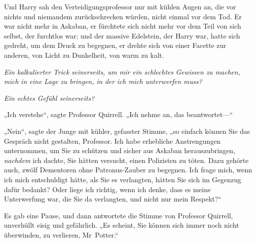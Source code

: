 Und Harry sah den Verteidigungsprofessor nur mit kühlen Augen an, die vor nichts und niemandem zurückschrecken würden, nicht einmal vor dem Tod. Er war nicht mehr in Askaban, er fürchtete sich nicht mehr vor dem Teil von sich selbst, der furchtlos war; und der massive Edelstein, der Harry war, hatte sich gedreht, um dem Druck zu begegnen, er drehte sich von einer Facette zur anderen, von Licht zu Dunkelheit, von warm zu kalt.

\emph{Ein kalkulierter Trick seinerseits, um mir ein schlechtes Gewissen zu machen, mich in eine Lage zu bringen, in der ich mich unterwerfen muss?}

\emph{Ein echtes Gefühl seinerseits?}

„Ich verstehe“, sagte Professor Quirrell. „Ich nehme an, das beantwortet—“

„Nein“, sagte der Junge mit kühler, gefasster Stimme, „so einfach können Sie das Gespräch nicht gestalten, Professor. Ich habe erhebliche Anstrengungen unternommen, um Sie zu schützen und sicher aus Askaban herauszubringen, \emph{nachdem} ich dachte, Sie hätten versucht, einen Polizisten zu töten. Dazu gehörte auch, zwölf Dementoren ohne Patronus-Zauber zu begegnen. Ich frage mich, wenn ich mich entschuldigt hätte, als Sie es verlangten, hätten Sie sich im Gegenzug dafür bedankt? Oder liege ich richtig, wenn ich denke, dass es meine Unterwerfung war, die Sie da verlangten, und nicht nur mein Respekt?“

Es gab eine Pause, und dann antwortete die Stimme von Professor Quirrell, unverhüllt eisig und gefährlich. „Es scheint, Sie können sich immer noch nicht überwinden, zu verlieren, Mr~Potter.“

